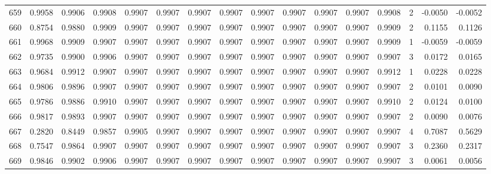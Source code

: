 \begin{tabular}{lrrrrrrrrrrrrrrr}
659 &      0.9958 &  0.9906 &  0.9908 &  0.9907 &  0.9907 &  0.9907 &  0.9907 &  0.9907 &  0.9907 &  0.9907 &   0.9907 &     0.9908 &      2 &                   -0.0050 &                    -0.0052 \\
660 &      0.8754 &  0.9880 &  0.9909 &  0.9907 &  0.9907 &  0.9907 &  0.9907 &  0.9907 &  0.9907 &  0.9907 &   0.9907 &     0.9909 &      2 &                    0.1155 &                     0.1126 \\
661 &      0.9968 &  0.9909 &  0.9907 &  0.9907 &  0.9907 &  0.9907 &  0.9907 &  0.9907 &  0.9907 &  0.9907 &   0.9907 &     0.9909 &      1 &                   -0.0059 &                    -0.0059 \\
662 &      0.9735 &  0.9900 &  0.9906 &  0.9907 &  0.9907 &  0.9907 &  0.9907 &  0.9907 &  0.9907 &  0.9907 &   0.9907 &     0.9907 &      3 &                    0.0172 &                     0.0165 \\
663 &      0.9684 &  0.9912 &  0.9907 &  0.9907 &  0.9907 &  0.9907 &  0.9907 &  0.9907 &  0.9907 &  0.9907 &   0.9907 &     0.9912 &      1 &                    0.0228 &                     0.0228 \\
664 &      0.9806 &  0.9896 &  0.9907 &  0.9907 &  0.9907 &  0.9907 &  0.9907 &  0.9907 &  0.9907 &  0.9907 &   0.9907 &     0.9907 &      2 &                    0.0101 &                     0.0090 \\
665 &      0.9786 &  0.9886 &  0.9910 &  0.9907 &  0.9907 &  0.9907 &  0.9907 &  0.9907 &  0.9907 &  0.9907 &   0.9907 &     0.9910 &      2 &                    0.0124 &                     0.0100 \\
666 &      0.9817 &  0.9893 &  0.9907 &  0.9907 &  0.9907 &  0.9907 &  0.9907 &  0.9907 &  0.9907 &  0.9907 &   0.9907 &     0.9907 &      2 &                    0.0090 &                     0.0076 \\
667 &      0.2820 &  0.8449 &  0.9857 &  0.9905 &  0.9907 &  0.9907 &  0.9907 &  0.9907 &  0.9907 &  0.9907 &   0.9907 &     0.9907 &      4 &                    0.7087 &                     0.5629 \\
668 &      0.7547 &  0.9864 &  0.9907 &  0.9907 &  0.9907 &  0.9907 &  0.9907 &  0.9907 &  0.9907 &  0.9907 &   0.9907 &     0.9907 &      3 &                    0.2360 &                     0.2317 \\
669 &      0.9846 &  0.9902 &  0.9906 &  0.9907 &  0.9907 &  0.9907 &  0.9907 &  0.9907 &  0.9907 &  0.9907 &   0.9907 &     0.9907 &      3 &                    0.0061 &                     0.0056 \\

\end{tabular}
